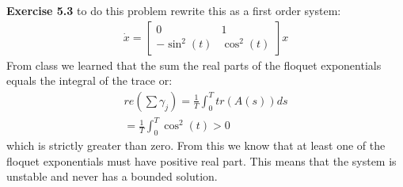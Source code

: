 \documentclass[12pt]{article}
\newenvironment{exercise}[1]{\vspace{.1in}\noindent\textbf{Exercise #1 \hspace{.05em}}}{}
\theoremstyle{definition}
\theoremstyle{remark}
\begin{document}
\begin{exercise}{5.3}
	to do this problem rewrite this as a first order system:
	\begin{align}
		\dot{x}=%
		\begin{bmatrix}
			0          & 1         \\
			-\sin^2(t) & \cos^2(t)
		\end{bmatrix}x
	\end{align}
	From class we learned that the sum the real parts of the floquet exponentials equals the integral of the trace or:
	\begin{align}
		re(\sum \gamma_j)=\frac{1}{T}\int_0^Ttr(A(s))ds \\
		=\frac{1}{T}\int_0^T \cos^2(t)>0
	\end{align}
	which is strictly greater than zero. From this we know that at least one of the floquet exponentials must have positive real part. This means that the system is unstable and never has a bounded solution.
\end{exercise}
\end{document}
